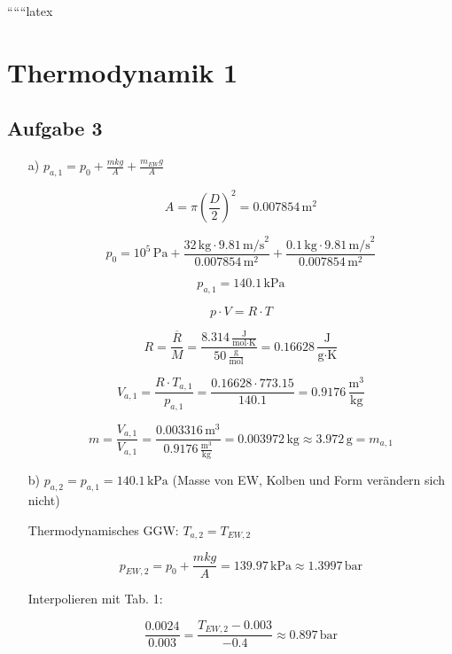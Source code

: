 
``````latex


\section*{Thermodynamik 1}

\subsection*{Aufgabe 3}

\begin{itemize}
    \item[a)] $p_{a,1} = p_0 + \frac{m k g}{A} + \frac{m_{EW} g}{A}$
    
    \[
    A = \pi \left( \frac{D}{2} \right)^2 = 0.007854 \, \text{m}^2
    \]
    
    \[
    p_0 = 10^5 \, \text{Pa} + \frac{32 \, \text{kg} \cdot 9.81 \, \text{m/s}^2}{0.007854 \, \text{m}^2} + \frac{0.1 \, \text{kg} \cdot 9.81 \, \text{m/s}^2}{0.007854 \, \text{m}^2}
    \]
    
    \[
    p_{a,1} = 140.1 \, \text{kPa}
    \]
    
    \[
    p \cdot V = R \cdot T
    \]
    
    \[
    R = \frac{\overline{R}}{M} = \frac{8.314 \, \frac{\text{J}}{\text{mol} \cdot \text{K}}}{50 \, \frac{\text{g}}{\text{mol}}} = 0.16628 \, \frac{\text{J}}{\text{g} \cdot \text{K}}
    \]
    
    \[
    V_{a,1} = \frac{R \cdot T_{a,1}}{p_{a,1}} = \frac{0.16628 \cdot 773.15}{140.1} = 0.9176 \, \frac{\text{m}^3}{\text{kg}}
    \]
    
    \[
    m = \frac{V_{a,1}}{V_{a,1}} = \frac{0.003316 \, \text{m}^3}{0.9176 \, \frac{\text{m}^3}{\text{kg}}} = 0.003972 \, \text{kg} \approx 3.972 \, \text{g} = m_{a,1}
    \]
    
    \item[b)] $p_{a,2} = p_{a,1} = 140.1 \, \text{kPa}$ \hspace{1cm} (Masse von EW, Kolben und Form verändern sich nicht)
    
    Thermodynamisches GGW: $T_{a,2} = T_{EW,2}$
    
    \[
    p_{EW,2} = p_0 + \frac{m k g}{A} = 139.97 \, \text{kPa} \approx 1.3997 \, \text{bar}
    \]
    
    Interpolieren mit Tab. 1:
    
    \[
    \frac{0.0024}{0.003} = \frac{T_{EW,2} - 0.003}{-0.4} \approx 0.897 \, \text{bar}
    \]
    

\end{itemize}
